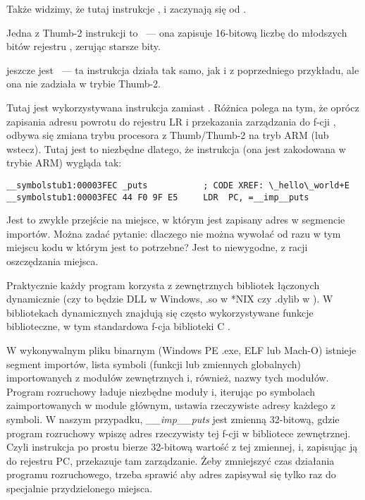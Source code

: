 Także widzimy, że tutaj instrukcje ,  i  zaczynają się od .

Jedna z Thumb-2 instrukcji to
~--- ona zapisuje 16-bitową liczbę do młodszych bitów rejestru , zerując starsze bity.

jeszcze jest ~--- ta instrukcja działa tak samo, jak i  z poprzedniego przykładu, ale ona nie zadziała w trybie Thumb-2.

Tutaj jest wykorzystywana instrukcja  zamiast .
Różnica polega na tym, że oprócz zapisania adresu powrotu do rejestru \ac{LR} i przekazania zarządzania 
do f-cji \puts, odbywa się zmiana trybu procesora z Thumb/Thumb-2 na tryb ARM (lub wstecz).
Tutaj jest to niezbędne dlatego, że instrukcja (ona jest zakodowana w trybie ARM) wygląda tak:

\begin{lstlisting}[style=customasmARM]
__symbolstub1:00003FEC _puts           ; CODE XREF: \_hello\_world+E
__symbolstub1:00003FEC 44 F0 9F E5     LDR  PC, =__imp__puts
\end{lstlisting}

Jest to zwykłe przejście na miejsce, w którym jest zapisany adres \puts w segmencie importów.
Można zadać pytanie: dlaczego nie można wywołać \puts od razu w tym miejscu kodu w którym jest to potrzebne?
Jest to niewygodne, z racji oszczędzania miejsca.

Praktycznie każdy program korzysta z zewnętrznych bibliotek łączonych dynamicznie (czy to będzie DLL w Windows, .so w *NIX 
czy .dylib w \MacOSX).
W bibliotekach dynamicznych znajdują się często wykorzystywane funkcje biblioteczne, w tym standardowa f-cja biblioteki C \puts.

W wykonywalnym pliku binarnym 
(Windows PE .exe, ELF lub Mach-O) istnieje segment importów, lista symboli (funkcji lub zmiennych globalnych) importowanych z modułów zewnętrznych i, również, nazwy tych modułów.
Program rozruchowy ładuje niezbędne moduły i, iterując po symbolach zaimportowanych w module głównym, ustawia rzeczywiste adresy każdego z symboli.
W naszym przypadku, \emph{\_\_imp\_\_puts} 
jest zmienną 32-bitową, gdzie program rozruchowy wpiszę adres rzeczywisty tej f-cji w bibliotece zewnętrznej. 
Czyli instrukcja  po prostu bierze 32-bitową wartość z tej zmiennej, i, zapisując ją do rejestru \ac{PC}, przekazuje tam zarządzanie.
Żeby zmniejszyć czas działania programu rozruchowego, trzeba sprawić aby adres zapisywał się tylko raz do specjalnie przydzielonego miejsca.

